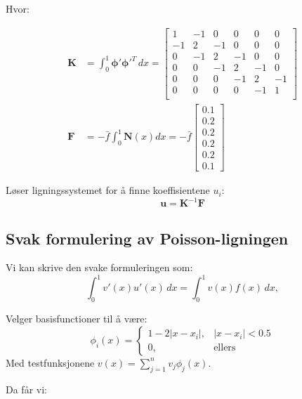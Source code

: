 \documentclass[../main.tex]{subfiles}
\begin{document}
Hvor:

\begin{align*}
    \symbf{K} & = \int_0^1 \symbf{\phi}' \symbf{\phi}'^T \, dx =
    \begin{bmatrix}
        1  & -1 & 0  & 0  & 0  & 0  \\
        -1 & 2  & -1 & 0  & 0  & 0  \\
        0  & -1 & 2  & -1 & 0  & 0  \\
        0  & 0  & -1 & 2  & -1 & 0  \\
        0  & 0  & 0  & -1 & 2  & -1 \\
        0  & 0  & 0  & 0  & -1 & 1  \\
    \end{bmatrix}                                  \\
    \symbf{F} & = - \bar{f} \int_0^1 \symbf{N}(x) dx
    = - \bar{f}
    \begin{bmatrix}
        0.1 \\ 0.2 \\ 0.2 \\ 0.2 \\ 0.2 \\ 0.1
    \end{bmatrix}
\end{align*}

Løser ligningssystemet for å finne koeffisientene \(u_i\):
\[
    \symbf{u} = \symbf{K}^{-1} \symbf{F}
\]

\subsection{Svak formulering av Poisson-ligningen}
Vi kan skrive den svake formuleringen som:
\[
    \int_0^1 v'(x) u'(x) \, dx = \int_0^1 v(x) f(x) \, dx,
\]

Velger basisfunctioner til å være:
\[
    \phi_i(x) = \begin{cases}
        1 - 2|x - x_i|, & |x - x_i| < 0.5 \\
        0,              & \text{ellers}
    \end{cases}
\]
Med testfunksjonene \(v(x) = \sum_{j=1}^n v_j \phi_j(x)\).

Da får vi:
\end{document}
